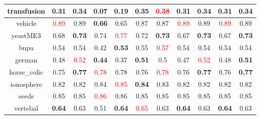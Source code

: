 \documentclass{article}%
\begin{document}
\begin{tabular}{c|cccccccccc}
\hline%
transfusion&0.31&\textbf{0.34}&0.07&\textbf{0.19}&0.35&\textcolor{red}{ 
0.38
}&0.31&\textbf{0.34}&0.31&\textbf{0.34}\\%
\hline%
vehicle&\textcolor{red}{ 
0.89
}&0.89&\textbf{0.66}&0.65&0.87&0.87&\textcolor{red}{ 
0.89
}&0.89&\textcolor{red}{ 
0.89
}&0.89\\%
\hline%
yeastME3&0.68&\textbf{0.73}&0.74&\textcolor{red}{ 
0.77
}&0.72&\textbf{0.73}&0.67&\textbf{0.73}&0.67&\textbf{0.73}\\%
\hline%
bupa&0.54&0.54&0.42&\textbf{0.53}&0.55&\textcolor{red}{ 
0.57
}&0.54&0.54&0.54&0.54\\%
\hline%
german&0.48&\textcolor{red}{ 
0.52
}&\textbf{0.44}&0.37&\textbf{0.51}&0.5&0.47&\textcolor{red}{ 
0.52
}&0.48&\textbf{0.51}\\%
\hline%
horse\_colic&0.75&\textbf{0.77}&\textcolor{red}{ 
0.78
}&0.78&0.76&\textcolor{red}{ 
0.78
}&0.76&\textbf{0.77}&0.76&\textbf{0.77}\\%
\hline%
ionosphere&0.82&0.82&0.84&\textcolor{red}{ 
0.85
}&\textbf{0.84}&0.83&0.82&0.82&0.82&0.82\\%
\hline%
seeds&0.85&0.85&\textcolor{red}{ 
0.86
}&0.86&0.85&0.85&0.85&0.85&0.85&0.85\\%
\hline%
vertebal&\textbf{0.64}&0.63&0.51&\textbf{0.64}&\textcolor{red}{ 
0.65
}&0.63&\textbf{0.64}&0.63&\textbf{0.64}&0.63\\%
\hline%
\end{tabular}

%
\end{document}
